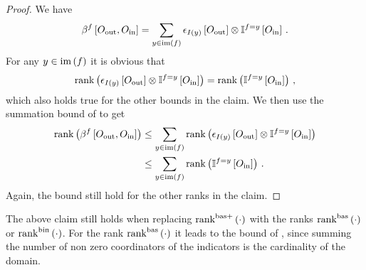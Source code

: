 \begin{proof}
    We have
    \begin{align*}
        \beta^{f}\left[O_{\mathrm{out}},O_{\mathrm{in}}\right]
        = \sum_{y\in\mathrm{im}\left(f\right)} \epsilon_{I(y)}\left[O_{\mathrm{out}}\right]
        \otimes \mathbb{I}^{f=y}\left[O_{\mathrm{in}}\right] \, .
    \end{align*}
    For any $y\in\mathrm{im}\left(f\right)$ it is obvious that
    \begin{align*}
        \mathrm{rank}\left(\epsilon_{I(y)}\left[O_{\mathrm{out}}\right]
        \otimes \mathbb{I}^{f=y}\left[O_{\mathrm{in}}\right]\right)
        = \mathrm{rank}\left(\mathbb{I}^{f=y}\left[O_{\mathrm{in}}\right]\right) \, ,
    \end{align*}
    which also holds true for the other bounds in the claim.
    We then use the summation bound of  to get
    \begin{align*}
        \mathrm{rank}\left(\beta^{f}\left[O_{\mathrm{out}},O_{\mathrm{in}}\right]\right)
        &\leq \sum_{y\in\mathrm{im}\left(f\right)} \mathrm{rank}\left(\epsilon_{I(y)}\left[O_{\mathrm{out}}\right]
        \otimes \mathbb{I}^{f=y}\left[O_{\mathrm{in}}\right]\right) \\
        &\leq  \sum_{y\in\mathrm{im}\left(f\right)} \mathrm{rank}\left(\mathbb{I}^{f=y}\left[O_{\mathrm{in}}\right]\right) \, .
    \end{align*}
    Again, the bound still hold for the other ranks in the claim.
\end{proof}

The above claim still holds when replacing $\mathrm{rank}^{\mathrm{bas+}}\left(\cdot\right)$ with the ranks $\mathrm{rank}^{\mathrm{bas}}\left(\cdot\right)$ or $\mathrm{rank}^{\mathrm{bin}}\left(\cdot\right)$.
For the rank $\mathrm{rank}^{\mathrm{bas}}\left(\cdot\right)$ it leads to the bound of , since summing the number of non zero coordinators of the indicators is the cardinality of the domain.

